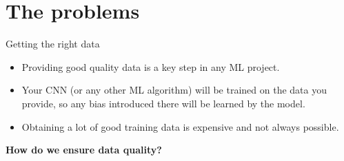\documentclass[9pt, aspectratio=169]{beamer}
\begin{document}
\section{The problems}

\begin{frame}
    {Getting the right data}
    \begin{itemize}
        \item Providing good quality data is a key step in any ML project.
        \item Your CNN (or any other ML algorithm) will be trained on the data you provide, so any bias introduced there will be learned by the model.
        \item Obtaining a lot of good training data is expensive and not always possible.
    \end{itemize}

    \centering
    \textbf{How do we ensure data quality?}
\end{frame}
\end{document}
